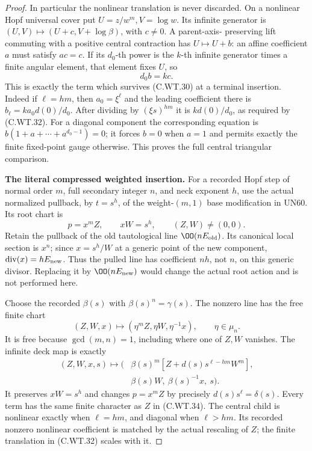 \begin{proof}
In particular the nonlinear
translation is never discarded.
On a nonlinear Hopf universal
cover put \(U=z/w^m,V=\log w\).
Its infinite generator is
\((U,V)\mapsto(U+c,V+\log\beta)\),
with \(c\ne0\). A parent-axis-
preserving lift commuting with
a positive central contraction
has \(U\mapsto U+b\):
an affine coefficient \(a\)
must satisfy \(ac=c\).
If its \(d_0\)-th power is the
\(k\)-th infinite generator
times a finite angular element,
that element fixes \(U\), so
\[
                                d_0b=kc.
 \tag{C.WT.32}
\]
This is exactly the term which
survives (C.WT.30) at a terminal
insertion. Indeed if \(\ell=hm\),
then \(a_0=\xi^{\ell}\) and the
leading coefficient there is
\(b_{\ell}=k a_0d(0)/d_0\).
After dividing by \((\xi s)^{hm}\)
it is \(k d(0)/d_0\), as required
by (C.WT.32). For a diagonal
component the corresponding
equation is
\(b(1+a+\cdots+a^{d_0-1})=0\);
it forces \(b=0\) when \(a=1\)
and permits exactly the finite
fixed-point gauge otherwise.
This proves the full central
triangular comparison.

\par\medskip\noindent\textbf{The literal compressed weighted insertion.}
For a recorded Hopf step of
normal order \(m\), full secondary
integer \(n\), and neck exponent
\(h\), use the actual normalized
pullback, by \(t=s^h\), of the
weight-\((m,1)\) base modification
in UN60. Its root chart is
\[
       p=x^m Z,\qquad xW=s^h,\qquad (Z,W)\ne(0,0).
 \tag{C.WT.33}
\]
Retain the pullback of the old
tautological line \(\OO(nE_{\rm old})\).
Its canonical local section is
\(x^n\); since \(x=s^h/W\) at a
generic point of the new component,
\(\operatorname{div}(x)=hE_{\rm new}\).
Thus the pulled line has coefficient
\(nh\), not \(n\), on this generic
divisor. Replacing it by
\(\OO(nE_{\rm new})\) would change
the actual root action and is not
performed here.

Choose the recorded \(\beta(s)\)
with \(\beta(s)^n=\gamma(s)\).
The nonzero line has the free
finite chart
\[
       (Z,W,x)\longmapsto
                   (\eta^mZ,\eta W,\eta^{-1}x),
                           \qquad\eta\in\mu_n.
 \tag{C.WT.34}
\]
It is free because
\(\gcd(m,n)=1\), including
where one of \(Z,W\) vanishes.
The infinite deck map is exactly
\[
 \begin{split}
 (Z,W,x,s)\longmapsto\bigl(
   &\beta(s)^m[Z+d(s)s^{\ell-hm}W^m],\\
   &\beta(s)W,\ \beta(s)^{-1}x,\ s\bigr).
 \end{split}
 \tag{C.WT.35}
\]
It preserves \(xW=s^h\) and
changes \(p=x^mZ\) by precisely
\(d(s)s^{\ell}=\delta(s)\).
Every term has the same finite
character as \(Z\) in
(C.WT.34). The central child
is nonlinear exactly when
\(\ell=hm\), and diagonal
when \(\ell>hm\). Its recorded
nonzero nonlinear coefficient
is matched by the actual
rescaling of \(Z\); the finite
translation in (C.WT.32)
scales with it.


\end{proof}
